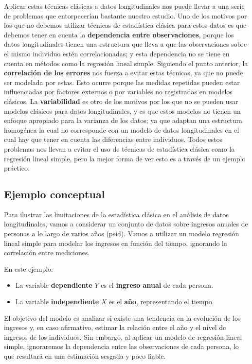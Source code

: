 \documentclass[
  letterpaper,
  DIV=11,
  numbers=noendperiod]{scrreprt}
\providecommand{\tightlist}{%
  \setlength{\itemsep}{0pt}\setlength{\parskip}{0pt}}\usepackage{longtable,booktabs,array}
\begin{document}
Aplicar estas técnicas clásicas a datos longitudinales nos puede llevar
a una serie de problemas que entorpecerían bastante nuestro estudio. Uno
de los motivos por los que no debemos utilizar técnicas de estadística
clásica para estos datos es que debemos tener en cuenta la
\textbf{dependencia entre observaciones}, porque los datos
longitudinales tienen una estructura que lleva a que las observaciones
sobre el mismo individuo estén correlacionadas; y esta dependencia no se
tiene en cuenta en métodos como la regresión lineal simple. Siguiendo el
punto anterior, la \textbf{correlación de los errores} nos fuerza a
evitar estas técnicas, ya que no puede ser modelada por estas. Esto
ocurre porque las medidas repetidas pueden estar influenciadas por
factores externos o por variables no registradas en modelos clásicos. La
\textbf{variabilidad} es otro de los motivos por los que no se pueden
usar modelos clásicos para datos longitudinales, y es que estos modelos
no tienen un enfoque apropiado para la varianza de los datos; ya que
adaptan una estructura homogénea la cual no corresponde con un modelo de
datos longitudinales en el cual hay que tener en cuenta las diferencias
entre individuos. Todos estos problemas nos llevan a evitar el uso de
técnicas de estadística clásica como la regresión lineal simple, pero la
mejor forma de ver esto es a través de un ejemplo práctico.

\subsection{Ejemplo conceptual}\label{ejemplo-conceptual}

Para ilustrar las limitaciones de la estadística clásica en el análisis
de datos longitudinales, vamos a considerar un conjunto de datos sobre
ingresos anuales de personas a lo largo de varios años (psid). Vamos a
utilizar un modelo regresión lineal simple para modelar los ingresos en
función del tiempo, ignorando la correlación entre mediciones.

En este ejemplo:

\begin{itemize}
\tightlist
\item
  La variable \textbf{dependiente} \(Y\) es el \textbf{ingreso anual} de
  cada persona.
\item
  La variable \textbf{independiente} \(X\) es el \textbf{año},
  representando el tiempo.
\end{itemize}

El objetivo del modelo es analizar si existe una tendencia en la
evolución de los ingresos y, en caso afirmativo, estimar la relación
entre el año y el nivel de ingresos de los individuos. Sin embargo, al
aplicar un modelo de regresión lineal simple, ignoraremos la dependencia
entre las observaciones de cada persona, lo que resultará en una
estimación sesgada y poco fiable.
\end{document}

